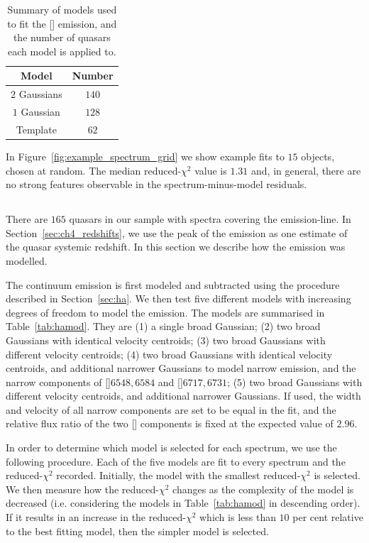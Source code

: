 \begin{table}
  \centering
  \footnotesize 
  \caption{Summary of models used to fit the [] emission, and the number of quasars each model is applied to.}
  \label{tab:oiiimod}
    \begin{tabular}{cc} 
    \hline
    Model & Number \\
    \hline
    $2$ Gaussians &  $140$ \\
    $1$ Gaussian  &  $128$ \\
    Template &  $62$ \\
    \hline
    \end{tabular}
\end{table} 

In Figure~\ref{fig:example_spectrum_grid} we show example fits to $15$ objects, chosen at random. 
The median reduced-$\chi^2$ value is $1.31$ and, in general, there are no strong features observable in the spectrum-minus-model residuals.

\subsection{\hans}
\label{sec:hamodel}

There are $165$ quasars in our sample with spectra covering the \ha emission-line. 
In Section~\ref{sec:ch4_redshifts}, we use the peak of the \ha emission as one estimate of the quasar systemic redshift. 
In this section we describe how the \ha emission was modelled. 

The continuum emission is first modeled and subtracted using the procedure described in Section~\ref{sec:ha}. 
We then test five different models with increasing degrees of freedom to model the \ha emission. 
The models are summarised in Table~\ref{tab:hamod}. 
They are (1) a single broad Gaussian; (2) two broad Gaussians with identical velocity centroids; (3) two broad Gaussians with different velocity centroids; (4) two broad Gaussians with identical velocity centroids, and additional narrower Gaussians to model narrow \ha emission, and the narrow components of []\ll$6548,6584$ and []\ll$6717,6731$; (5) two broad Gaussians with different velocity centroids, and additional narrower Gaussians. 
If used, the width and velocity of all narrow components are set to be equal in the fit, and the relative flux ratio of the two [] components is fixed at the expected value of $2.96$.

In order to determine which model is selected for each spectrum, we use the following procedure.  
Each of the five models are fit to every spectrum and the reduced-$\chi^2$ recorded.
Initially, the model with the smallest reduced-$\chi^2$ is selected. 
We then measure how the reduced-$\chi^2$ changes as the complexity of the model is decreased (i.e. considering the models in Table~\ref{tab:hamod} in descending order). 
If it results in an increase in the reduced-$\chi^2$ which is less than $10$ per cent relative to the best fitting model, then the simpler model is selected.  

